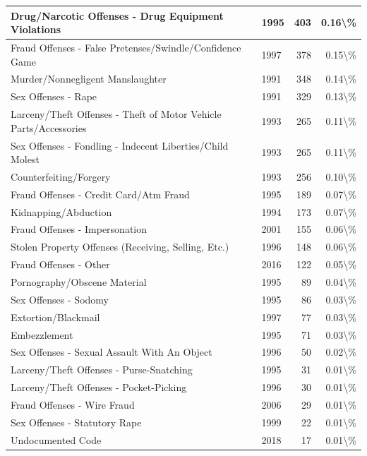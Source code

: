 \documentclass[
]{krantz}
\begin{document}
\begin{longtable}[t]{l|l|r|r}
\hline
Drug/Narcotic Offenses - Drug Equipment Violations & 1995 & 403 & 0.16\textbackslash{}\%\\
\hline
Fraud Offenses - False Pretenses/Swindle/Confidence Game & 1997 & 378 & 0.15\textbackslash{}\%\\
\hline
Murder/Nonnegligent Manslaughter & 1991 & 348 & 0.14\textbackslash{}\%\\
\hline
Sex Offenses - Rape & 1991 & 329 & 0.13\textbackslash{}\%\\
\hline
Larceny/Theft Offenses - Theft of Motor Vehicle Parts/Accessories & 1993 & 265 & 0.11\textbackslash{}\%\\
\hline
Sex Offenses - Fondling - Indecent Liberties/Child Molest & 1993 & 265 & 0.11\textbackslash{}\%\\
\hline
Counterfeiting/Forgery & 1993 & 256 & 0.10\textbackslash{}\%\\
\hline
Fraud Offenses - Credit Card/Atm Fraud & 1995 & 189 & 0.07\textbackslash{}\%\\
\hline
Kidnapping/Abduction & 1994 & 173 & 0.07\textbackslash{}\%\\
\hline
Fraud Offenses - Impersonation & 2001 & 155 & 0.06\textbackslash{}\%\\
\hline
Stolen Property Offenses (Receiving, Selling, Etc.) & 1996 & 148 & 0.06\textbackslash{}\%\\
\hline
Fraud Offenses - Other & 2016 & 122 & 0.05\textbackslash{}\%\\
\hline
Pornography/Obscene Material & 1995 & 89 & 0.04\textbackslash{}\%\\
\hline
Sex Offenses - Sodomy & 1995 & 86 & 0.03\textbackslash{}\%\\
\hline
Extortion/Blackmail & 1997 & 77 & 0.03\textbackslash{}\%\\
\hline
Embezzlement & 1995 & 71 & 0.03\textbackslash{}\%\\
\hline
Sex Offenses - Sexual Assault With An Object & 1996 & 50 & 0.02\textbackslash{}\%\\
\hline
Larceny/Theft Offenses - Purse-Snatching & 1995 & 31 & 0.01\textbackslash{}\%\\
\hline
Larceny/Theft Offenses - Pocket-Picking & 1996 & 30 & 0.01\textbackslash{}\%\\
\hline
Fraud Offenses - Wire Fraud & 2006 & 29 & 0.01\textbackslash{}\%\\
\hline
Sex Offenses - Statutory Rape & 1999 & 22 & 0.01\textbackslash{}\%\\
\hline
Undocumented Code & 2018 & 17 & 0.01\textbackslash{}\%\\

\end{longtable}
\end{document}
